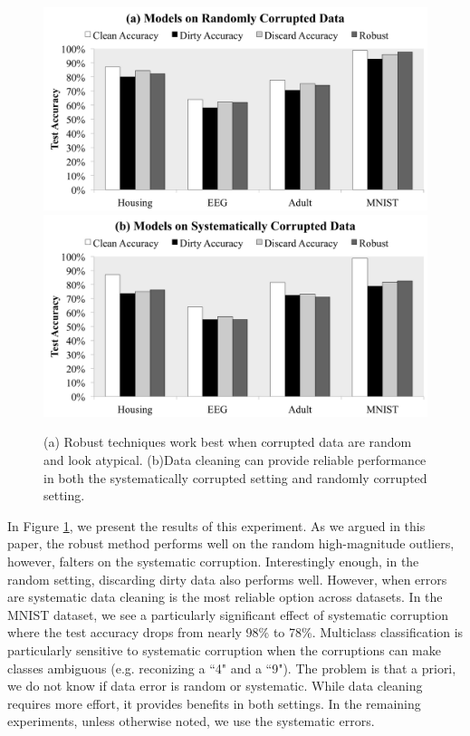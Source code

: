 \begin{figure}[ht!]
\centering
 \includegraphics[width=\columnwidth]{exp/exp2.pdf}
 \includegraphics[width=\columnwidth]{exp/exp1.pdf}
 \caption{(a) Robust techniques work best when corrupted data are random and look atypical. (b)Data cleaning can provide reliable performance in both the systematically corrupted setting and randomly corrupted setting.\label{sys-rand}}
\end{figure}

In Figure \ref{sys-rand}, we present the results of this experiment.
As we argued in this paper, the robust method performs well on the random high-magnitude outliers, however, falters on the systematic corruption.
Interestingly enough, in the random setting, discarding dirty data also performs well.
However, when errors are systematic data cleaning is the most reliable option across datasets.
In the MNIST dataset, we see a particularly significant effect of systematic corruption
where the test accuracy drops from nearly 98\% to 78\%.
Multiclass classification is particularly sensitive to systematic corruption when the corruptions can make classes ambiguous (e.g. reconizing a ``4" and a ``9").
The problem is that a priori, we do not know if data error is random or systematic.
While data cleaning requires more effort, it provides benefits in both settings.
In the remaining experiments, unless otherwise noted, we use the systematic errors.


